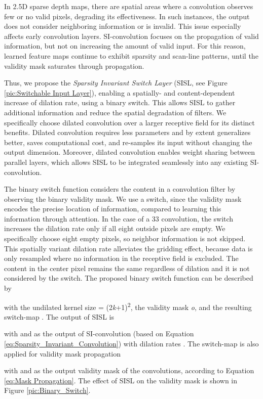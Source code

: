 \documentclass[letterpaper, 10 pt, conference]{ieeeconf}  \usepackage{geometry}
\begin{document}
In 2.5D sparse depth maps, there are spatial areas where a convolution observes few or no valid pixels, degrading its effectiveness. In such instances, the output does not consider neighboring information or is invalid. This issue especially affects early convolution layers. SI-convolution focuses on the propagation of valid information, but not on increasing the amount of valid input. For this reason, learned feature maps continue to exhibit sparsity and scan-line patterns, until the validity mask saturates through propagation.

Thus, we propose the \textit{Sparsity Invariant Switch Layer} (SISL, see Figure \ref{pic:Switchable Input Layer}), enabling a spatially- and content-dependent increase of dilation rate, using a binary switch. This allows SISL to gather additional information and reduce the spatial degradation of filters.  We specifically choose dilated convolution over a larger receptive field for its distinct benefits. Dilated convolution requires less parameters and by extent generalizes better, saves computational cost, and re-samples its input without changing the output dimension. Moreover, dilated convolution enables weight sharing between parallel layers, which allows SISL to be integrated seamlessly into any existing SI-convolution.

The binary switch function considers the content in a convolution filter by observing the binary validity mask. We use a switch, since the validity mask encodes the precise location of information, compared to learning this information through attention. In the case of a 33 convolution, the switch increases the dilation rate only if all eight outside pixels are empty. We specifically choose eight empty pixels, so neighbor information is not skipped. This spatially variant dilation rate alleviates the gridding effect, because data is only resampled where no information in the receptive field is excluded. The content in the center pixel remains the same regardless of dilation and it is not considered by the switch. The proposed binary switch function can be described by

with the undilated kernel size = (2\textit{k}+1)\textsuperscript{2}, the validity mask \textit{o}, and the resulting switch-map . The output of SISL is

with  and  as the output of SI-convolution (based on Equation \ref{eq:Sparsity_Invariant_Convolution}) with dilation rates . The switch-map is also applied for validity mask propagation

with  and   as the output validity mask of the convolutions, according to Equation \ref{eq:Mask Propagation}. The effect of SISL on the validity mask is shown in Figure \ref{pic:Binary_Switch}.
\end{document}
